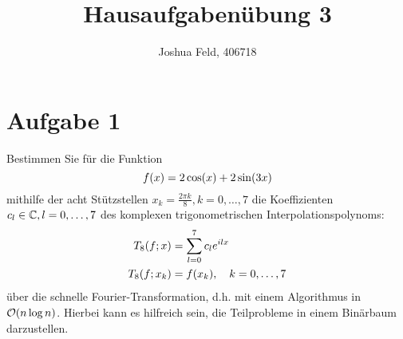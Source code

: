 \documentclass{exercise}
\institute{Applied and Computational Mathematics}
\title{Hausaufgabenübung 3}
\author{Joshua Feld, 406718}
\begin{document}
    \maketitle


    \section*{Aufgabe 1}

    \begin{problem}
        Bestimmen Sie für die Funktion
        \[
            f\parentheses*{x} = 2\cos\parentheses*{x} + 2\sin\parentheses*{3x}
        \]
        mithilfe der acht Stützstellen \(x_k = \frac{2\pi k}{8}, k = 0, \ldots, 7\) die Koeffizienten \(c_l \in \mathbb{C}, l = 0, \ldots, 7\) des komplexen trigonometrischen Interpolationspolynoms:
        \begin{align*}
            T_8\parentheses*{f; x} &= \sum_{l = 0}^7 c_l e^{ilx}\\
            T_8\parentheses*{f; x_k} &= f\parentheses*{x_k}, \quad k = 0, \ldots, 7
        \end{align*}
        über die schnelle Fourier-Transformation, d.h. mit einem Algorithmus in \(\mathcal{O}\parentheses*{n\log n}\).
        Hierbei kann es hilfreich sein, die Teilprobleme in einem Binärbaum darzustellen.
    \end{problem}
\end{document}
